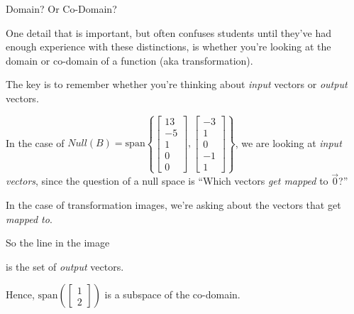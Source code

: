 \documentclass{ximera}
\begin{document}
\begin{exploration}{Domain? Or Co-Domain?}

  One detail that is important, but often confuses students until they've had enough experience with these distinctions, is whether you're looking at the domain or co-domain of a function (aka transformation).

  The key is to remember whether you're thinking about \emph{input} vectors or \emph{output} vectors.

  In the case of $Null(B)=\text{span}\left\{ \begin{bmatrix} 13 \\ -5 \\ 1 \\ 0 \\ 0 \end{bmatrix}, \begin{bmatrix} -3 \\ 1 \\ 0 \\ -1 \\ 1 \end{bmatrix} \right\}$, we are looking at \emph{input vectors}, since the question of a null space is ``Which vectors \emph{get mapped} to $\vec{0}$?''

  In the case of transformation images, we're asking about the vectors that get \emph{mapped to}.

  So the line in the image

  \begin{center}
\end{center}

is the set of \emph{output} vectors.

Hence, $\mbox{span}\left(\begin{bmatrix}1\\2\end{bmatrix}\right)$ is a subspace of the co-domain. 

\end{exploration}
\end{document}

